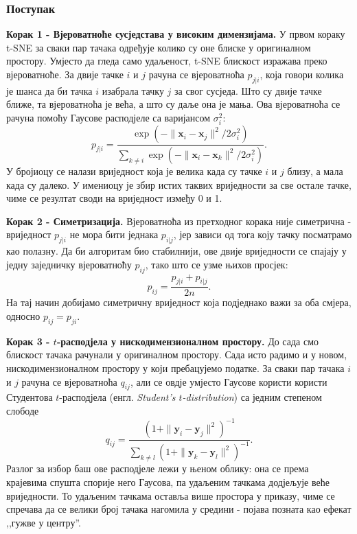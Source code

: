 \documentclass{article}
\begin{document}
	\subsubsection{Поступак}
	
	\textbf{Корак 1 - Вјероватноће сусједстава у високим димензијама.} У првом кораку t-SNE за сваки пар тачака одређује колико су оне блиске у оригиналном простору. Умјесто да гледа само удаљеност, t-SNE блискост изражава преко вјероватноће. За двије тачке $i$ и $j$ рачуна се вјероватноћа $p_{j|i}$, која говори колика је шанса да би тачка $i$ изабрала тачку $j$ за свог сусједа. Што су двије тачке ближе, та вјероватноћа је већа, а што су даље она је мања. Ова вјероватноћа се рачуна помоћу Гаусове расподјеле са варијансом $\sigma_i^2$:
	\begin{equation} \label{eq:tsne_p}
		p_{j|i} = \frac{\exp\!\left(-\|\mathbf{x}_i - \mathbf{x}_j\|^2 / 2\sigma_i^2\right)}{\displaystyle\sum_{k \neq i} \exp\!\left(-\|\mathbf{x}_i - \mathbf{x}_k\|^2 / 2\sigma_i^2\right)}.
	\end{equation}
	У бројиоцу се налази вриједност која је велика када су тачке $i$ и $j$ близу, а мала када су далеко. У имениоцу је збир истих таквих вриједности за све остале тачке, чиме се резултат своди на вриједност између 0 и 1.
	
	\textbf{Корак 2 - Симетризација.} Вјероватноћа из претходног корака није симетрична - вриједност $p_{j|i}$ не мора бити једнака $p_{i|j}$, јер зависи од тога коју тачку посматрамо као полазну. Да би алгоритам био стабилнији, ове двије вриједности се спајају у једну заједничку вјероватноћу $p_{ij}$, тако што се узме њихов просјек:
	\begin{equation} \label{eq:tsne_sym}
		p_{ij} = \frac{p_{j|i} + p_{i|j}}{2n}.
	\end{equation}
	На тај начин добијамо симетричну вриједност која подједнако важи за оба смјера, односно $p_{ij} = p_{ji}$.
	
	\textbf{Корак 3 - $t$-расподјела у нискодимензионалном простору.} До сада смо блискост тачака рачунали у оригиналном простору. Сада исто радимо и у новом, нискодимензионалном простору у који пребацујемо податке. За сваки пар тачака $i$ и $j$ рачуна се вјероватноћа $q_{ij}$, али се овдје умјесто Гаусове користи користи Студентова $t$-расподјела (енгл. \textit{Student's $t$-distribution}) са једним степеном слободе
	\begin{equation} \label{eq:tsne_q}
		q_{ij} = \frac{\left(1 + \|\mathbf{y}_i - \mathbf{y}_j\|^2\right)^{-1}}{\displaystyle\sum_{k \neq l} \left(1 + \|\mathbf{y}_k - \mathbf{y}_l\|^2\right)^{-1}}.
	\end{equation}
	Разлог за избор баш ове расподјеле лежи у њеном облику: она се према крајевима спушта спорије него Гаусова, па удаљеним тачкама додјељује веће вриједности. То удаљеним тачкама оставља више простора у приказу, чиме се спречава да се велики број тачака нагомила у средини - појава позната као ефекат ,,гужве у центру''.
	
\end{document}

